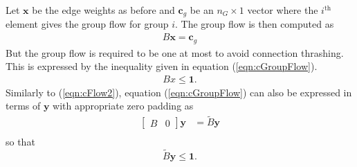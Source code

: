 Let $\mathbf{x}$ be the edge weights as before and $\mathbf{c}_g$ be an $n_G \times 1$ vector where the $i^{\text{th}}$ element gives the group flow for group $i$. The group flow is then computed as 
\begin{align}\label{eqn:cGroupFlow1}
	B\mathbf{x} = \mathbf{c}_g
\end{align}
But the group flow is required to be one at most to avoid connection thrashing.  This is expressed by the inequality given in equation (\ref{eqn:cGroupFlow}).
\begin{align}\label{eqn:cGroupFlow}
	Bx \le \mathbf{1}.
\end{align}
Similarly to (\ref{eqn:cFlow2}), equation (\ref{eqn:cGroupFlow}) can also be expressed in terms of $\mathbf{y}$ with appropriate zero padding as
\begin{equation}
	\begin{aligned}
		\begin{bmatrix} B & 0\end{bmatrix} \mathbf{y} &= \tilde{B}\mathbf{y} \\
	\end{aligned}
\end{equation}
so that
\begin{equation}\label{eqn:cGroupFlow2}
	\tilde{B}\mathbf{y} \le \mathbf{1}.
\end{equation}
